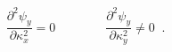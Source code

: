 \begin{equation}
{\frac{\partial^2 \psi_y }{\partial \kappa^2_x}} = 0\qquad\qquad
	{\frac{\partial^2 \psi_y }{\partial \kappa^2_y}} \ne 0 \;\; .	
\label{eq:laplace2}
\end{equation}

